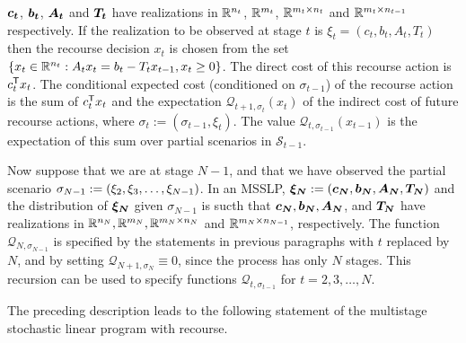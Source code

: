 $\mathbf{\boldsymbol{c_t}}$, $\mathbf{\boldsymbol{b_t}}$, $\mathbf{\boldsymbol{A_t}}$ and
$\mathbf{\boldsymbol{T_t}}$ have realizations in ${\mathbb R}^{n_t}$, ${\mathbb R}^{m_t}$,
${\mathbb R}^{m_t\times n_t}$ and ${\mathbb R}^{m_t\times n_{t-1}}$
respectively. If the realization
to be observed at stage $t$ is 
$\xi_t = (c_t,b_t,A_t, T_t)$ then the recourse decision $x_t$
is chosen from the set 
$\{x_t\in{\mathbb R}^{n_t}: A_tx_t = b_t - T_t x_{t-1},
x_t \geq 0\}$. The direct cost of this recourse action
is $c_t^{\mbox{\scriptsize\sf T}} x_t$.  The conditional expected cost (conditioned on $\sigma_{t-1}$) of the recourse action is the sum of $c_t^{\mbox{\scriptsize\sf T}} x_t$ and the expectation $\mathcal{Q}_{t+1,\sigma_t}(x_t)$ of the indirect cost of future recourse actions, where $\sigma_t := (\sigma_{t-1}, \xi_t)$.  The value $\mathcal{Q}_{t,\sigma_{t-1}}(x_{t-1})$ is the expectation of this sum over partial scenarios in $\mathcal{S}_{t-1}$.
\par
Now suppose that we are at stage $N-1$, and that we have observed the partial scenario $\sigma_{N-1}:= (\xi_2, \xi_3, \ldots, \xi_{N-1})$.  In an MSSLP, $\mathbf{\boldsymbol{\xi_N}}:= (\mathbf{\boldsymbol{c_N}}, \mathbf{\boldsymbol{b_N}}, \mathbf{\boldsymbol{A_N}}, \mathbf{\boldsymbol{T_N}})$ and the distribution of $\mathbf{\boldsymbol{\xi_N}}$ given $\sigma_{N-1}$ is sucth that $\mathbf{\boldsymbol{c_N}}, \mathbf{\boldsymbol{b_N}}, \mathbf{\boldsymbol{A_N}}$, and $\mathbf{\boldsymbol{T_N}}$ have realizations in ${\mathbb R}^{n_N}, {\mathbb R}^{m_N}, {\mathbb R}^{m_N\times n_N}$ and ${\mathbb R}^{m_N\times n_{N-1}}$, respectively.  The function $\mathcal{Q}_{N,\sigma_{N-1}}$ is specified by the statements in previous paragraphs with $t$ replaced by $N$, and by setting $\mathcal{Q}_{N+1,\sigma_N}\equiv 0$, since the process has only $N$ stages.  This recursion can be used to specify functions $\mathcal{Q}_{t,\sigma_{t-1}}$ for $t=2,3,\ldots,N$.
\par
The preceding description leads to the following statement of the  multistage stochastic linear
program with recourse.
